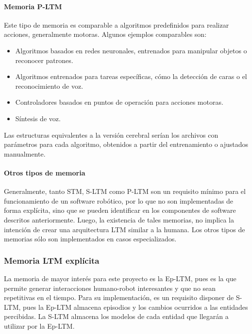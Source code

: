 \paragraph{Memoria P-LTM}
Este tipo de memoria es comparable a algoritmos predefinidos para realizar acciones, generalmente motoras.  Algunos ejemplos comparables son: 
\begin{itemize}[topsep=0pt]
	\item Algoritmos basados en redes neuronales, entrenados para manipular objetos o reconocer patrones.
	\item Algoritmos entrenados para tareas específicas, cómo la detección de caras o el reconocimiento de voz.
	\item Controladores basados en puntos de operación para acciones motoras.
	\item Síntesis de voz.
\end{itemize}

Las estructuras equivalentes a la versión cerebral serían los archivos con parámetros para cada algoritmo, obtenidos a partir del entrenamiento o ajustados manualmente.


\paragraph{Otros tipos de memoria}
Generalmente, tanto STM, S-LTM como P-LTM son un requisito mínimo para el funcionamiento de un software robótico, por lo que no son implementadas de forma explícita, sino que se pueden identificar en los componentes de software descritos anteriormente. Luego, la existencia de tales memorias, no implica la intención de crear una arquitectura LTM similar a la humana. Los otros tipos de memorias sólo son implementados en casos especializados.



\subsubsection{Memoria LTM explícita}\label{sec:ltm_exp}



La memoria de mayor interés para este proyecto es la Ep-LTM, pues es la que permite generar interacciones humano-robot interesantes y que no sean repetitivas en el tiempo. Para su implementación, es un requisito disponer de S-LTM, pues la Ep-LTM almacena episodios y los cambios ocurridos a las entidades percibidas. La S-LTM almacena los modelos de cada entidad que llegarán a utilizar por la Ep-LTM.

